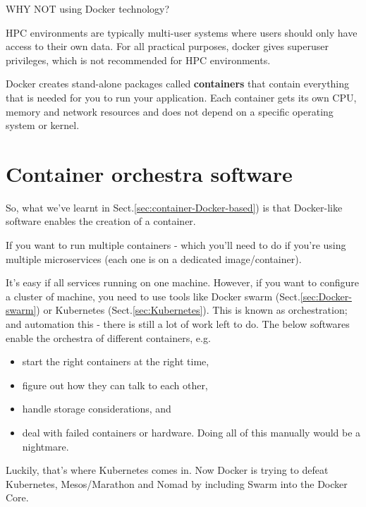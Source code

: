\begin{mdframed}
WHY NOT using Docker technology?

HPC environments are typically multi-user systems where users should only have
access to their own data. For all practical purposes, docker gives superuser
privileges, which is not recommended for HPC environments.

Docker creates stand-alone packages called {\bf containers} that contain
everything that is needed for you to run your application.
Each container gets its own CPU, memory and network resources and does not
depend on a specific operating system or kernel.
\end{mdframed}




\section{Container orchestra software}

So, what we've learnt in Sect.\ref{sec:container-Docker-based}) is that
Docker-like software enables the creation of a container.

If you want to run multiple containers  - which you’ll need to do if you’re
using multiple microservices (each one is on a dedicated image/container).

It's easy if all services running on one machine. However, if you want to
configure a cluster of machine, you need to use tools like Docker swarm
(Sect.\ref{sec:Docker-swarm}) or Kubernetes (Sect.\ref{sec:Kubernetes}).
This is known as orchestration; and automation this - there is still a lot of
work left to do. The below softwares enable the orchestra of different
containers, e.g.
\begin{itemize}
  
  \item   start the right containers at the right time, 
  
  \item figure out how they can talk to each other, 
  
  \item handle storage considerations, and 
  
  \item deal with failed containers or hardware. Doing all of this manually
  would be a nightmare. 
  
  
\end{itemize}

Luckily, that’s where Kubernetes comes in. Now Docker is trying to defeat
Kubernetes, Mesos/Marathon and Nomad by including Swarm into the Docker Core.


